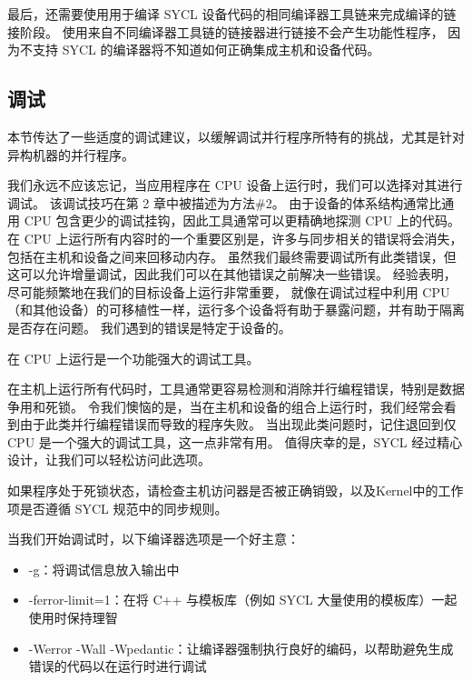 最后，还需要使用用于编译 SYCL 设备代码的相同编译器工具链来完成编译的链接阶段。 
使用来自不同编译器工具链的链接器进行链接不会产生功能性程序，
因为不支持 SYCL 的编译器将不知道如何正确集成主机和设备代码。

\subsection{调试}
本节传达了一些适度的调试建议，以缓解调试并行程序所特有的挑战，尤其是针对异构机器的并行程序。

我们永远不应该忘记，当应用程序在 CPU 设备上运行时，我们可以选择对其进行调试。 
该调试技巧在第 2 章中被描述为方法\#2。
由于设备的体系结构通常比通用 CPU 包含更少的调试挂钩，因此工具通常可以更精确地探测 CPU 上的代码。 
在 CPU 上运行所有内容时的一个重要区别是，许多与同步相关的错误将会消失，包括在主机和设备之间来回移动内存。 
虽然我们最终需要调试所有此类错误，但这可以允许增量调试，因此我们可以在其他错误之前解决一些错误。 
经验表明，尽可能频繁地在我们的目标设备上运行非常重要，
就像在调试过程中利用 CPU（和其他设备）的可移植性一样，运行多个设备将有助于暴露问题，并有助于隔离是否存在问题。 
我们遇到的错误是特定于设备的。

\begin{remark}[调试提示]
在 CPU 上运行是一个功能强大的调试工具。
\end{remark}

在主机上运行所有代码时，工具通常更容易检测和消除并行编程错误，特别是数据争用和死锁。 
令我们懊恼的是，当在主机和设备的组合上运行时，我们经常会看到由于此类并行编程错误而导致的程序失败。 
当出现此类问题时，记住退回到仅 CPU 是一个强大的调试工具，这一点非常有用。 
值得庆幸的是，SYCL 经过精心设计，让我们可以轻松访问此选项。

\begin{remark}[调试提示]
如果程序处于死锁状态，请检查主机访问器是否被正确销毁，以及Kernel中的工作项是否遵循 SYCL 规范中的同步规则。
\end{remark}

当我们开始调试时，以下编译器选项是一个好主意：

\begin{itemize}
	\item -g：将调试信息放入输出中

	\item -ferror-limit=1：在将 C++ 与模板库（例如 SYCL 大量使用的模板库）一起使用时保持理智

	\item -Werror -Wall -Wpedantic：让编译器强制执行良好的编码，以帮助避免生成错误的代码以在运行时进行调试
\end{itemize}

